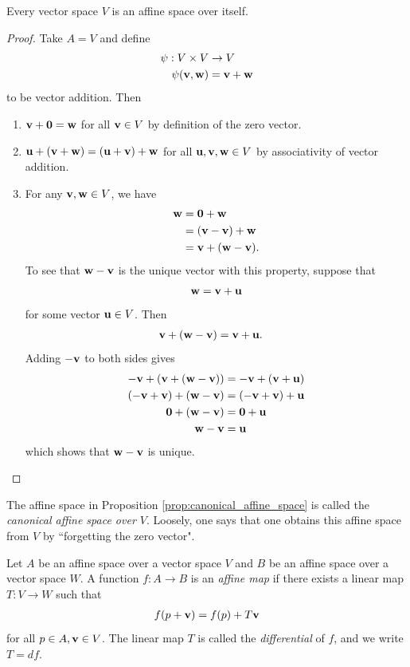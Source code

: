 \documentclass[12pt,letterpaper,reqno]{article}
\numberwithin{equation}{section}
\newcommand{\zv}{{\bf 0}}
\newcommand{\bu}{{\bf u}}
\newcommand{\bv}{{\bf v}}
\newcommand{\bw}{{\bf w}}
\begin{document}
{\begin{prop}\label{prop:canonical_affine_space}
	Every vector space $V$ is an affine space over itself.
\end{prop}

\begin{proof}
	Take $A=V$ and define 
	\begin{align*}
		\psi:V \times V &\to V \\
		\psi(\bv,\bw)&=\bv+\bw
	\end{align*}
	to be vector addition. Then
	\begin{enumerate}
		\item $\bv+\zv=\bw$ for all $\bv \in V$ by definition of the zero vector.
		\item $\bu+(\bv+\bw)=(\bu+\bv)+\bw$ for all $\bu,\bv,\bw \in V$ by associativity of vector addition.
		\item For any $\bv, \bw \in V$, we have
		\begin{align*}
			\bw &=\zv+\bw \\
			&=(\bv-\bv)+\bw \\
			&=\bv+(\bw-\bv).
		\end{align*}
		To see that $\bw-\bv$ is the unique vector with this property, suppose that 
		\begin{align*}
			\bw=\bv+\bu
		\end{align*}
		for some vector $\bu \in V$. Then
		\begin{align*}
			\bv+(\bw-\bv)&=\bv+\bu.
		\end{align*}
		Adding $-\bv$ to both sides gives
		\begin{align*}
		-\bv+(\bv+(\bw-\bv))&=-\bv+(\bv+\bu) \\
		(-\bv+\bv)+(\bw-\bv)&=(-\bv+\bv)+\bu \\
		\zv+(\bw-\bv)&=\zv+\bu \\
		\bw-\bv&=\bu \\
		\end{align*}
		which shows that $\bw-\bv$ is unique.
	\end{enumerate}
\end{proof}

The affine space in Proposition \ref{prop:canonical_affine_space} is called the \emph{canonical affine space over $V$}. Loosely, one says that one obtains this affine space from $V$ by ``forgetting the zero vector".

\begin{defn}\label{def:affine_map}
	Let $A$ be an affine space over a vector space $V$ and $B$ be an affine space over a vector space $W$. A function $f:A \to B$ is an \emph{affine map} if there exists a linear map $T:V \to W$ such that
	\begin{align*}
		f(p+\bv)=f(p)+T\bv
	\end{align*}
	for all $p \in A, \bv \in V$. The linear map $T$ is called the \emph{differential} of $f$, and we write $T=df$.
\end{defn}

}
\end{document}
